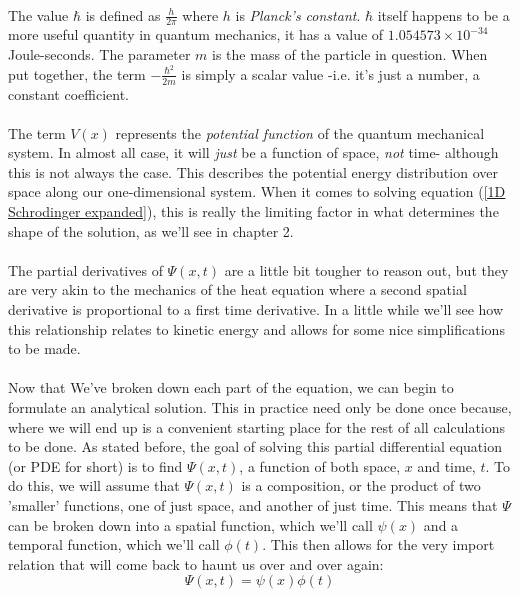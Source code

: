 \documentclass[12pt,letterpaper]{book}
\begin{document}
\paragraph*{}The value $\hbar$ is defined as $\frac{h}{2\pi}$ where $h$ is \textit{Planck's constant}. $\hbar$ itself happens to be a more useful quantity in quantum mechanics, it has a value of $1.054573\times 10^{-34}$ Joule-seconds. The parameter $m$ is the mass of the particle in question. When put together, the term $-\frac{\hbar^2}{2m}$ is simply a scalar value -i.e. it's just a number, a constant coefficient.
\paragraph*{}The term $V(x)$ represents the \textit{potential function} of the quantum mechanical system. In almost all case, it will \textit{just} be a function of space, \textit{not} time- although this is not always the case. This describes the potential energy distribution over space along our one-dimensional system. When it comes to solving equation (\ref{1D Schrodinger expanded}), this is really the limiting factor in what determines the shape of the solution, as we'll see in chapter 2.
\paragraph*{}The partial derivatives of $\Psi(x,t)$ are a little bit tougher to reason out, but they are very akin to the mechanics of the heat equation where a second spatial derivative is proportional to a first time derivative. In a little while we'll see how this relationship relates to kinetic energy and allows for some nice simplifications to be made.
\paragraph*{}Now that We've broken down each part of the equation, we can begin to formulate an analytical solution. This in practice need only be done once because, where we will end up is a convenient starting place for the rest of all calculations to be done. As stated before, the goal of solving this partial differential equation (or PDE for short) is to find $\Psi(x,t)$, a function of both space, $x$ and time, $t$. To do this, we will assume that $\Psi(x,t)$ is a composition, or the product of two 'smaller' functions, one of just space, and another of just time. This means that $\Psi$ can be broken down into a spatial function, which we'll call $\psi(x)$ and a temporal function, which we'll call $\phi(t)$. This then allows for the very import relation that will come back to haunt us over and over again:
\begin{equation}
\label{separable}
\Psi(x,t) = \psi(x)\phi(t)
\end{equation}
\end{document}
